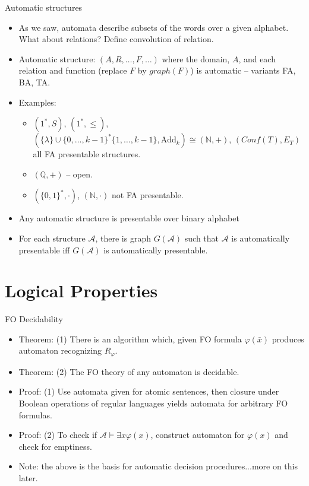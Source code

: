\documentclass[style=fyma
 ]{powerdot}
\begin{document}
\begin{slide}{Automatic structures}
  \begin{itemize}
    \item As we saw, automata describe subsets of the words over a given alphabet.  What about relations?  Define convolution of relation.
    \item Automatic structure: $(A, R, \ldots, F, \ldots)$ where the domain, $A$, and each relation and function (replace $F$ by $graph(F)$) is automatic -- variants FA, BA, TA.  
    \item Examples:
      \begin{itemize}
        \item $(1^{*}, S)$, $(1^{*}, \leq)$, $( \{ \lambda \} \cup \{0, \ldots, k-1\}^{*}\{ 1, \ldots, k-1\}, \text{Add}_{k}) \cong (\mathbb{N}, +)$, $(Conf(T), E_{T})$ all FA presentable structures.
       \medskip
        \item $(\mathbb{Q}, +)$ -- open.
       \medskip
        \item $(\{ 0,1\}^{*}, \cdot)$, $(\mathbb{N}, \cdot)$ not FA presentable.
      \end{itemize}
    \item Any automatic structure is presentable over binary alphabet
    \item For each structure $\mathcal{A}$, there is graph $G(\mathcal{A})$ such that $\mathcal{A}$ is automatically presentable iff $G(\mathcal{A})$ is automatically presentable.
  \end{itemize}
\end{slide}

\section{Logical Properties}

\begin{slide}{FO Decidability}
\begin{itemize}
  \item Theorem: (1) There is an algorithm which, given FO formula $\varphi(\bar{x})$ produces automaton recognizing $R_{\varphi}$.
  \item Theorem: (2) The FO theory of any automaton is decidable.
  
  \medskip
  \pause
  \item Proof: (1) Use automata given for atomic sentences, then closure under Boolean operations of regular languages yields automata for arbitrary FO formulas.
  \item Proof: (2) To check if $\mathcal{A} \vDash \exists x \varphi(x)$, construct automaton for $\varphi(x)$ and check for emptiness.

  \bigskip
  \item Note: the above is the basis for automatic decision procedures...more on this later.
  \end{itemize}
\end{slide}
\end{document}
